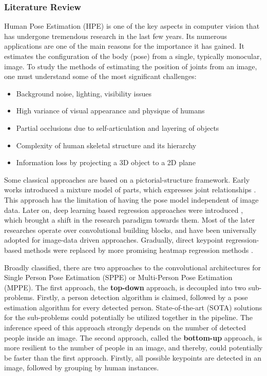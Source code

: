 \documentclass[sigconf]{acmart}
\begin{document}
\subsubsection{Literature Review}
Human Pose Estimation (HPE) is one of the key aspects in computer vision that has undergone tremendous research in the last few years. Its numerous applications are one of the main reasons for the importance it has gained. It estimates the configuration of the body (pose) from a single, typically monocular, image. To study the methods of estimating the position of joints from an image, one must understand some of the most significant challenges: 
\begin{itemize}
    \item Background noise, lighting, visibility issues
    \item High variance of visual appearance and physique of humans
    \item Partial occlusions due to self-articulation and layering of objects
    \item Complexity of human skeletal structure and its hierarchy
    \item Information loss by projecting a 3D object to a 2D plane
\end{itemize}
Some classical approaches are based on a pictorial-structure framework. Early works introduced a mixture model of parts, which expresses joint relationships \cite{6380498}. This approach has the limitation of having the pose model independent of image data. Later on, deep learning based regression approaches were introduced \cite{A}, which brought a shift in the research paradigm towards them. Most of the later researches operate over convolutional building blocks, and have been universally adopted for image-data driven approaches. Gradually, direct keypoint regression-based methods were replaced by more promising heatmap regression methods \cite{7780880}. 

Broadly classified, there are two approaches to the convolutional architectures for Single Person Pose Estimation (SPPE) or Multi-Person Pose Estimation (MPPE). The first approach, the \textbf{top-down} approach, is decoupled into two sub-problems. Firstly, a person detection algorithm is claimed, followed by a pose estimation algorithm for every detected person. State-of-the-art (SOTA) solutions for the sub-problems could potentially be utilized together in the pipeline. The inference speed of this approach strongly depends on the number of detected people inside an image. The second approach, called the \textbf{bottom-up} approach, is more resilient to the number of people in an image, and thereby, could potentially be faster than the first approach. Firstly, all possible keypoints are detected in an image, followed by grouping by human instances.
\end{document}
